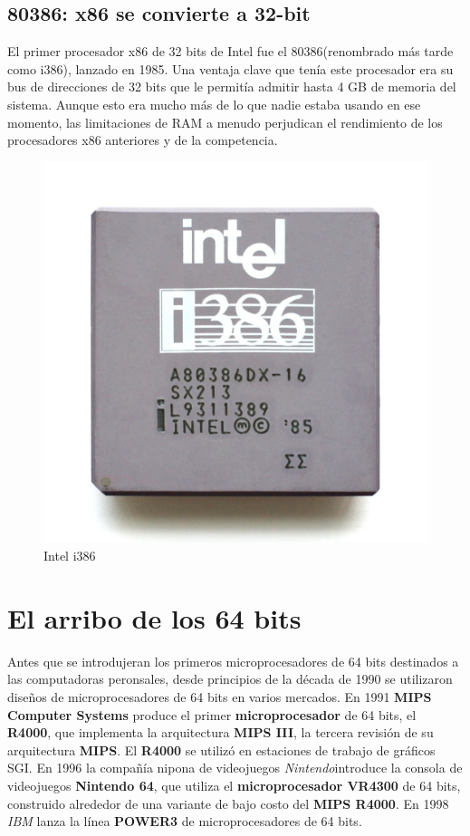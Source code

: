\subsection{80386: x86 se convierte a 32-bit}
El primer procesador x86 de 32 bits de Intel fue el 80386(renombrado más tarde como i386), lanzado en 1985. Una ventaja clave que tenía este procesador era su bus de 
direcciones de 32 bits que le permitía admitir hasta 4 GB de memoria del sistema. Aunque esto era mucho más de lo que nadie estaba 
usando en ese momento, las limitaciones de RAM a menudo perjudican el rendimiento de los procesadores x86 anteriores y de la competencia.
\begin{figure}[htb]
	\centering
	\includegraphics[scale = 0.1]{Graphics/Intel_i386DX.jpg}
	\caption{Intel i386}
	\label{fig:18}
\end{figure}
\newpage
\section{El arribo de los 64 bits}
Antes que se introdujeran los primeros microprocesadores de 64 bits destinados a las computadoras peronsales, desde principios de la década de
1990 se utilizaron diseños de microprocesadores de 64 bits en varios mercados. En 1991 \textbf{MIPS Computer Systems} produce el primer \textbf
{microprocesador} de 64 bits, el \textbf{R4000}, que implementa la arquitectura \textbf{MIPS III}, la tercera revisión de su arquitectura \textbf{MIPS}.
El \textbf{R4000} se utilizó en estaciones de trabajo de gráficos SGI. En 1996 la compañía nipona de videojuegos \emph{Nintendo}introduce la consola de
videojuegos \textbf{Nintendo 64}, que utiliza el \textbf{microprocesador VR4300} de 64 bits, construido alrededor de una variante de bajo costo del
\textbf{MIPS R4000}. En 1998 \emph{IBM} lanza la línea \textbf{POWER3} de microprocesadores de 64 bits. 

